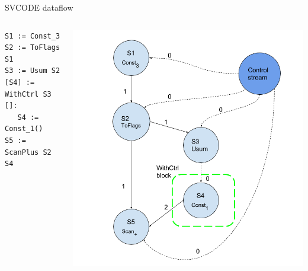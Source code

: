 \documentclass{beamer}
\begin{document}
\begin{frame}[fragile]{SVCODE dataflow}
\begin{columns}
\begin{column}{0.36\textwidth}

\begin{lstlisting}[style=svcode-style]
S1 := Const_3
S2 := ToFlags S1
S3 := Usum S2
[S4] := WithCtrl S3 []:
   S4 := Const_1()
S5 := ScanPlus S2 S4
\end{lstlisting}	
	\end{column}	
	\begin{column}{0.64\textwidth}
	\includegraphics[width=1.1\textwidth]{../fig/dataflow.png}
	\end{column}
\end{columns}
\end{frame}
\end{document}

